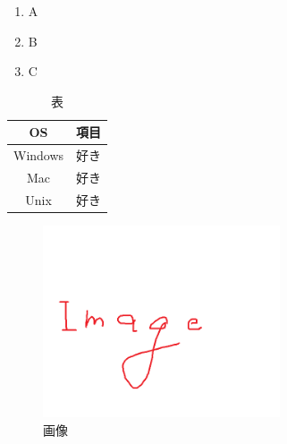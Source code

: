 \documentclass{jsarticle}
\begin{document}
%

\begin{enumerate}
  \item A
  \item B
  \item C
\end{enumerate}

\begin{table}[htb]
  \centering
  \caption{表}
  \begin{tabular}{|c|c|}\hline 
    OS       & 項目 \\  \hline \hline
    Windows  & 好き \\  \hline
    Mac      & 好き \\  \hline
    Unix     & 好き \\  \hline

  \end{tabular}
\end{table}

\begin{figure}[H]
  \centering
  \includegraphics[width=7cm]{image.jpg}
  \caption{画像} \label{fig:image}
\end{figure}
\end{document}
